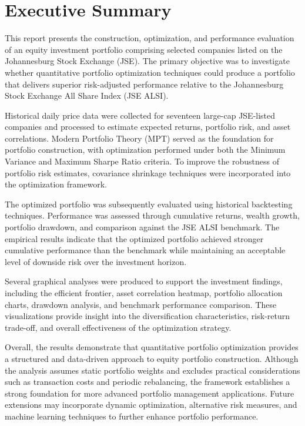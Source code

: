 \chapter*{Executive Summary}

This report presents the construction, optimization, and performance evaluation of an equity investment portfolio comprising selected companies listed on the Johannesburg Stock Exchange (JSE). The primary objective was to investigate whether quantitative portfolio optimization techniques could produce a portfolio that delivers superior risk-adjusted performance relative to the Johannesburg Stock Exchange All Share Index (JSE ALSI).

Historical daily price data were collected for seventeen large-cap JSE-listed companies and processed to estimate expected returns, portfolio risk, and asset correlations. Modern Portfolio Theory (MPT) served as the foundation for portfolio construction, with optimization performed under both the Minimum Variance and Maximum Sharpe Ratio criteria. To improve the robustness of portfolio risk estimates, covariance shrinkage techniques were incorporated into the optimization framework.

The optimized portfolio was subsequently evaluated using historical backtesting techniques. Performance was assessed through cumulative returns, wealth growth, portfolio drawdown, and comparison against the JSE ALSI benchmark. The empirical results indicate that the optimized portfolio achieved stronger cumulative performance than the benchmark while maintaining an acceptable level of downside risk over the investment horizon.

Several graphical analyses were produced to support the investment findings, including the efficient frontier, asset correlation heatmap, portfolio allocation charts, drawdown analysis, and benchmark performance comparison. These visualizations provide insight into the diversification characteristics, risk-return trade-off, and overall effectiveness of the optimization strategy.

Overall, the results demonstrate that quantitative portfolio optimization provides a structured and data-driven approach to equity portfolio construction. Although the analysis assumes static portfolio weights and excludes practical considerations such as transaction costs and periodic rebalancing, the framework establishes a strong foundation for more advanced portfolio management applications. Future extensions may incorporate dynamic optimization, alternative risk measures, and machine learning techniques to further enhance portfolio performance.

\clearpage